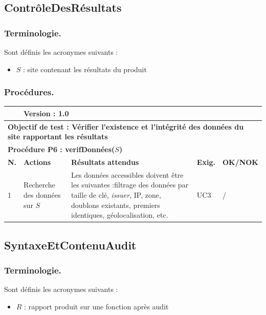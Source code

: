 \documentclass[a4paper,11pt,french]{article}
\begin{document}
\subsection{ContrôleDesRésultats}
\subsubsection*{Terminologie.}
Sont définis les acronymes suivants : 
\begin{itemize}
\item $S$ : site contenant les résultats du produit
\end{itemize}

\subsubsection*{Procédures.}
\noindent
\begin{tabular}{|p{0.5cm}| p{6cm} | p{1cm} | p{4cm} | p{1.5cm}| p{1.5cm}|} 
\hline
\rowcolor{blue}
\multicolumn{2}{|l|}{\color{white}\bfseries{Objet testé : \color{white} \bfseries{ContrôleDesRésultats} }} & 
\multicolumn{4}{l|}{\color{white}\bfseries{Version : \color{white}\bfseries{1.0} }}\\
\hline
\multicolumn{6}{|l|}{\textbf{Objectif de test : Vérifier l'existence et l'intégrité des données du site rapportant les résultats } }\\
\hline
\multicolumn{6}{|l|}{\textbf{Procédure P6 : verifDonnées($S$)} }\\
\hline
\textbf{N.} & \textbf{Actions} & \multicolumn{2}{p{5cm}|}{\textbf{Résultats attendus}} & \textbf{Exig.} & \textbf{OK/NOK} \\
\hline
1 & Recherche des données sur $S$ & \multicolumn{2}{p{6cm}|}{Les données accessibles doivent être les suivantes :\newline [indispensables] filtrage des données par taille de clé, \textit{issuer}, IP, zone, doublons existants, premiers identiques, \newline [facultatives] géolocalisation, etc. } & UC3 & / \\

\hline
\end{tabular}


\subsection{SyntaxeEtContenuAudit}
\subsubsection*{Terminologie.}
Sont définis les acronymes suivants : 
\begin{itemize}
\item $R$ : rapport produit sur une fonction après audit
\end{itemize}
\end{document}
